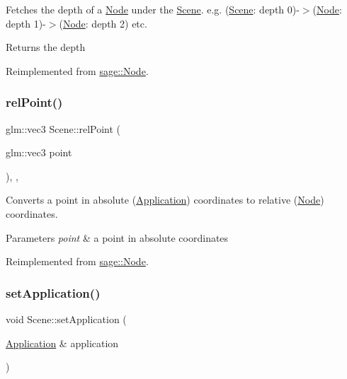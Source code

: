 Fetches the depth of a \mbox{\hyperlink{classsage_1_1Node}{Node}} under the \mbox{\hyperlink{classsage_1_1Scene}{Scene}}. e.\+g. (\mbox{\hyperlink{classsage_1_1Scene}{Scene}}\+: depth 0)-\/$>$(\mbox{\hyperlink{classsage_1_1Node}{Node}}\+: depth 1)-\/$>$(\mbox{\hyperlink{classsage_1_1Node}{Node}}\+: depth 2) etc. 

\begin{DoxyReturn}{Returns}
the depth 
\end{DoxyReturn}


Reimplemented from \mbox{\hyperlink{classsage_1_1Node_a91e68b6452280bd6d273ff62105a5fe8}{sage\+::\+Node}}.

\mbox{\label{classsage_1_1Scene_ae68e14c0f453db078df4b515fdea83f7}} 
\subsubsection{\texorpdfstring{relPoint()}{relPoint()}}
{\footnotesize\ttfamily glm\+::vec3 Scene\+::rel\+Point (\begin{DoxyParamCaption}\item[{glm\+::vec3}]{point }\end{DoxyParamCaption})\hspace{0.3cm}{\ttfamily [override]}, {\ttfamily [protected]}, {\ttfamily [virtual]}}



Converts a point in absolute (\mbox{\hyperlink{classsage_1_1Application}{Application}}) coordinates to relative (\mbox{\hyperlink{classsage_1_1Node}{Node}}) coordinates. 


\begin{DoxyParams}{Parameters}
{\em point} & a point in absolute coordinates \\
\hline
\end{DoxyParams}


Reimplemented from \mbox{\hyperlink{classsage_1_1Node_a40edd1724c0956ef7794225fba8353c0}{sage\+::\+Node}}.

\mbox{\label{classsage_1_1Scene_a358126a7522477066667d48787ac3176}} 
\subsubsection{\texorpdfstring{setApplication()}{setApplication()}}
{\footnotesize\ttfamily void Scene\+::set\+Application (\begin{DoxyParamCaption}\item[{\mbox{\hyperlink{classsage_1_1Application}{Application}} \&}]{application }\end{DoxyParamCaption})\hspace{0.3cm}{\ttfamily [protected]}}



